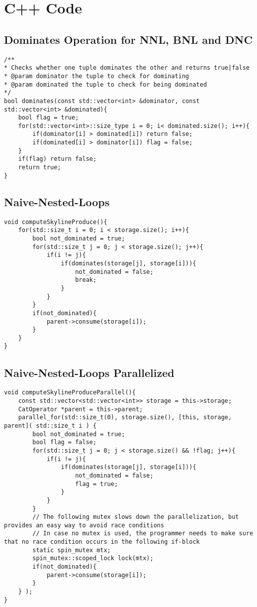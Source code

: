 \chapter{C++ Code} \label{appendix-code}

\section{Dominates Operation for NNL, BNL and DNC}
\begin{verbatim}
/**
* Checks whether one tuple dominates the other and returns true|false
* @param dominator the tuple to check for dominating
* @param dominated the tuple to check for being dominated
*/
bool dominates(const std::vector<int> &dominator, const std::vector<int> &dominated){
	bool flag = true;
	for(std::vector<int>::size_type i = 0; i< dominated.size(); i++){
		if(dominator[i] > dominated[i]) return false;
		if(dominated[i] > dominator[i]) flag = false;
	}
	if(flag) return false;
	return true;
}
\end{verbatim}

\section{Naive-Nested-Loops}
\begin{verbatim}
void computeSkylineProduce(){
	for(std::size_t i = 0; i < storage.size(); i++){
		bool not_dominated = true;
		for(std::size_t j = 0; j < storage.size(); j++){
			if(i != j){
				if(dominates(storage[j], storage[i])){
					not_dominated = false;
					break;
				}
			}
		}
		if(not_dominated){
			parent->consume(storage[i]);
		}
	}
}
\end{verbatim}

\section{Naive-Nested-Loops Parallelized}
\begin{verbatim}
void computeSkylineProduceParallel(){
	const std::vector<std::vector<int>> storage = this->storage;
	CatOperator *parent = this->parent;
	parallel_for(std::size_t(0), storage.size(), [this, storage, parent]( std::size_t i ) {
		bool not_dominated = true;
		bool flag = false;
		for(std::size_t j = 0; j < storage.size() && !flag; j++){
			if(i != j){
				if(dominates(storage[j], storage[i])){
					not_dominated = false;
					flag = true;
				}
			}
		}
		// The following mutex slows down the parallelization, but provides an easy way to avoid race conditions
		// In case no mutex is used, the programmer needs to make sure that no race condition occurs in the following if-block
		static spin_mutex mtx;
		spin_mutex::scoped_lock lock(mtx);
		if(not_dominated){
			parent->consume(storage[i]);
		}
	} );
}
\end{verbatim}

